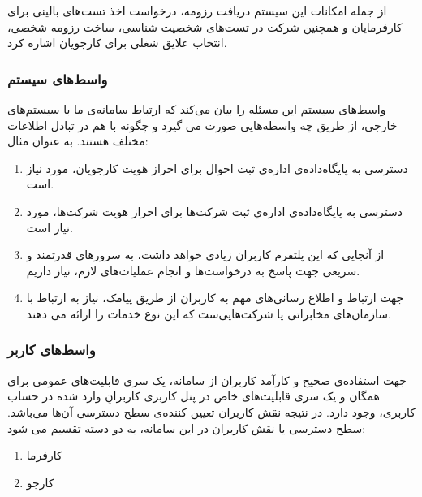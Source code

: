 \documentclass{report}
\begin{document}
				از جمله امکانات این سیستم دریافت رزومه، درخواست اخذ تست‌های بالینی برای کارفرمایان و همچنین شرکت در تست‌های شخصیت شناسی، ساخت رزومه شخصی، انتخاب علایق شغلی برای کارجویان اشاره کرد.
				
				\subsubsection{واسط‌های سیستم}
					واسط‌های سیستم این مسئله را بیان می‌کند که ارتباط سامانه‌ی ما با سیستم‌های خارجی، از طریق چه واسطه‌هایی صورت می گیرد و چگونه با هم در تبادل اطلاعات مختلف هستند. به عنوان مثال:
					\begin{enumerate}
						\item 
	دسترسی به پایگاه‌داده‌ی اداره‌ی ثبت احوال برای احراز هویت کارجو‌یان، مورد نیاز است.
						\item 
	دسترسی به پایگاه‌داده‌ی اداره‌ي ثبت شرکت‌ها برای احراز هویت شرکت‌ها، مورد نیاز است.
						\item 
	از آنجایی که این پلتفرم کاربران زیادی خواهد داشت، به سرور‌های قدرتمند و سریعی جهت پاسخ به درخواست‌ها و انجام عملیات‌های لازم، نیاز داریم.
						\item 
	جهت ارتباط و اطلاع رسانی‌های مهم به کاربران از طریق پیامک، نیاز به ارتباط با سازمان‌های مخابراتی یا شرکت‌هایی‌ست که این نوع خدمات را ارائه می دهند.
					\end{enumerate}
				\subsubsection{واسط‌های کاربر}
					جهت استفاده‌ی صحیح و کارآمد کاربران از سامانه، یک سری قابلیت‌های عمومی برای همگان و یک سری قابلیت‌های خاص در پنل کاربری کاربرانِ وارد شده در حساب کاربری، وجود دارد. در نتیجه نقش کاربران تعیین کننده‌ی سطح دسترسی آن‌ها می‌باشد. 
					سطح‌ دسترسی یا نقش کاربران در این سامانه، به دو دسته تقسیم می شود:
					\begin{enumerate}
						\item کارفرما
						\item کارجو
					\end{enumerate}
\end{document}
